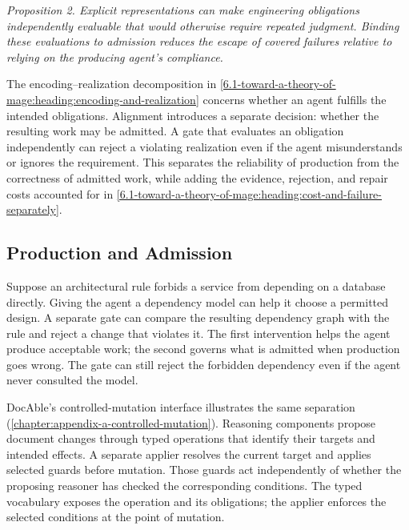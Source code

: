 
\emph{Proposition 2. Explicit representations can make engineering obligations independently evaluable that would otherwise require repeated judgment. Binding these evaluations to admission reduces the escape of covered failures relative to relying on the producing agent's compliance.}

The encoding–realization decomposition in \autoref{6.1-toward-a-theory-of-mage:heading:encoding-and-realization} concerns whether an agent fulfills the intended obligations. Alignment introduces a separate decision: whether the resulting work may be admitted. A gate that evaluates an obligation independently can reject a violating realization even if the agent misunderstands or ignores the requirement. This separates the reliability of production from the correctness of admitted work, while adding the evidence, rejection, and repair costs accounted for in \autoref{6.1-toward-a-theory-of-mage:heading:cost-and-failure-separately}.

\subsection{Production and Admission}\label{heading:production-and-admission}


Suppose an architectural rule forbids a service from depending on a database directly. Giving the agent a dependency model can help it choose a permitted design. A separate gate can compare the resulting dependency graph with the rule and reject a change that violates it. The first intervention helps the agent produce acceptable work; the second governs what is admitted when production goes wrong. The gate can still reject the forbidden dependency even if the agent never consulted the model.

DocAble's controlled-mutation interface illustrates the same separation (\autoref{chapter:appendix-a-controlled-mutation}). Reasoning components propose document changes through typed operations that identify their targets and intended effects. A separate applier resolves the current target and applies selected guards before mutation. Those guards act independently of whether the proposing reasoner has checked the corresponding conditions. The typed vocabulary exposes the operation and its obligations; the applier enforces the selected conditions at the point of mutation.

